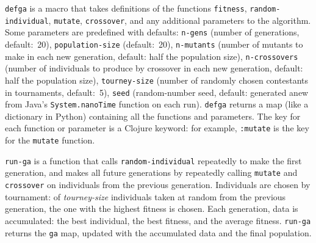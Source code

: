 \documentclass[letterpaper,11pt]{report}
\begin{document}
\texttt{defga} is a macro that takes definitions of the functions
\texttt{fitness}, \texttt{random-individual}, \texttt{mutate},
\texttt{crossover}, and any additional parameters to the algorithm. Some
parameters are predefined with defaults: \texttt{n-gens} (number of
generations, default:~20), \texttt{population-size} (default:~20),
\texttt{n-mutants} (number of mutants to make in each new generation, default:
half the population size), \texttt{n-crossovers} (number of individuals to
produce by crossover in each new generation, default: half the population
size), \texttt{tourney-size} (number of randomly chosen contestants in
tournaments, default:~5), \texttt{seed} (random-number seed, default:
generated anew from Java's \texttt{System.nanoTime} function on each run).
\texttt{defga} returns a map (like a dictionary in Python) containing all the
functions and parameters.  The key for each function or parameter is a Clojure
keyword: for example, \texttt{:mutate} is the key for the \texttt{mutate}
function.

\texttt{run-ga} is a function that calls
\texttt{random-individual} repeatedly to make the first generation, and makes
all future generations by repeatedly calling \texttt{mutate} and
\texttt{crossover} on individuals from the previous generation. 
Individuals are chosen by tournament: of \textit{tourney-size} individuals
taken at random from the previous generation, the one with the highest
fitness is chosen. Each generation, data is accumulated: the best individual,
the best fitness, and the average fitness. \texttt{run-ga} returns the
\texttt{ga} map, updated with the accumulated data and the final population.
\end{document}
